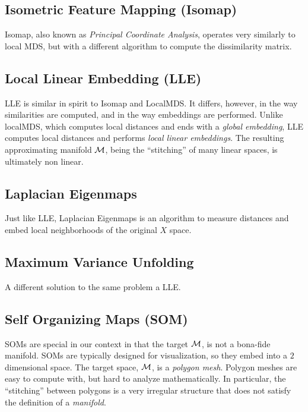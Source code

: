 \documentclass[12pt,a4paper]{article}
\begin{document}
\subsection{Isometric Feature Mapping (Isomap)}
\label{sec:isomap}

Isomap, also known as \emph{Principal Coordinate Analysis}, operates very similarly to local MDS, but with a different algorithm to compute the dissimilarity matrix.




\subsection{Local Linear Embedding (LLE)}
\label{sec:lle}

LLE is similar in spirit to Isomap and LocalMDS.
It differs, however, in the way similarities are computed, and in the way embeddings are performed. 
Unlike localMDS, which computes local distances and ends with a \emph{global embedding}, LLE computes local distances and performs \emph{local linear embeddings}.
The resulting approximating manifold $\mathcal{M}$, being the ``stitching'' of many linear spaces, is ultimately non linear.



\subsection{Laplacian Eigenmaps}
Just like LLE, Laplacian Eigenmaps is an algorithm to measure distances and embed local neighborhoods of the original $X$ space.


\subsection{Maximum Variance Unfolding}
A different solution to the same problem a LLE.



\subsection{Self Organizing Maps (SOM)}
SOMs are special in our context in that the target $\mathcal{M}$, is not a bona-fide manifold. 
SOMs are typically designed for visualization, so they embed into a $2$ dimensional space. 
The target space, $\mathcal{M}$, is a \emph{polygon mesh}.
Polygon meshes are easy to compute with, but hard to analyze mathematically. 
In particular, the ``stitching'' between polygons is a very irregular structure that does not satisfy the definition of a \emph{manifold}.
\end{document}
